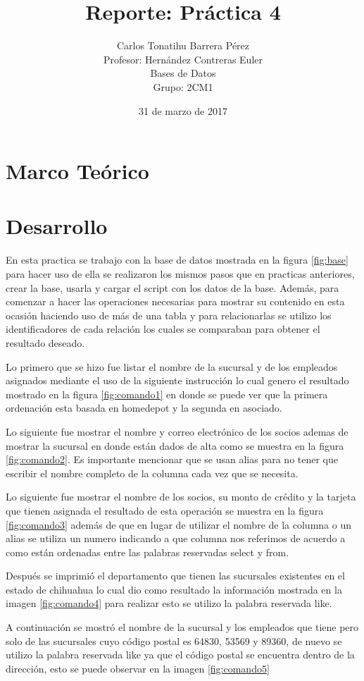 \documentclass[12pt, titlepage]{article}
\title{Reporte: Práctica 4}
\author{Carlos Tonatihu Barrera Pérez \\ Profesor: Hernández Contreras Euler \\ Bases de Datos \\ Grupo: 2CM1 }
\date{31 de marzo de 2017}
\begin{document}
\maketitle
\tableofcontents
\section{Marco Teórico}
\section{Desarrollo}
En esta practica se trabajo con la base de datos mostrada en la figura \ref{fig:base} para hacer uso de ella se realizaron los mismos pasos que en practicas anteriores, crear la base, usarla y cargar el script con los datos de la base. Además, para comenzar a hacer las operaciones necesarias para mostrar su contenido en esta ocasión haciendo uso de más de una tabla y para relacionarlas se utilizo los identificadores de cada relación los cuales se comparaban para obtener el resultado deseado.

Lo primero que se hizo fue listar el nombre de la sucursal y de los empleados asignados mediante el uso de la siguiente instrucción lo cual genero el resultado mostrado en la figura \ref{fig:comando1} en donde se puede ver que la primera ordenación esta basada en homedepot y la segunda en asociado.

Lo siguiente fue mostrar el nombre y correo electrónico de los socios ademas de mostrar la sucursal en donde están dados de alta como se muestra en la figura \ref{fig:comando2}. Es importante mencionar que se usan alias para no tener que escribir el nombre completo de la columna cada vez que se necesita.

Lo siguiente fue mostrar el nombre de los socios, su monto de crédito y la tarjeta que tienen asignada el resultado de esta operación se muestra en la figura \ref{fig:comando3} además de que en lugar de utilizar el nombre de la columna o un alias se utiliza un numero indicando a que columna nos referimos de acuerdo a como están ordenadas entre las palabras reservadas select y from.

Después se imprimió el departamento que tienen las sucursales existentes en el estado de chihuahua lo cual dio como resultado la información mostrada en la imagen \ref{fig:comando4} para realizar esto se utilizo la palabra reservada like.

A continuación se mostró el nombre de la sucursal y los empleados que tiene pero solo de las sucursales cuyo código postal es 64830, 53569 y 89360, de nuevo se utilizo la palabra reservada like ya que el código postal se encuentra dentro de la dirección, esto se puede observar en la imagen \ref{fig:comando5}
\end{document}
